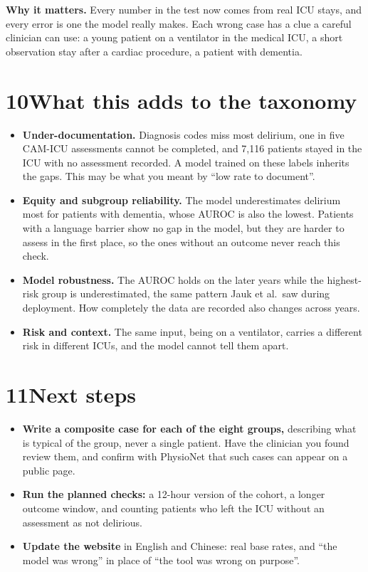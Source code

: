 \documentclass[11pt]{article}
\newcommand{\why}[1]{\begin{whynote}\textbf{\color{accent}Why it matters.} #1\end{whynote}}
\newcommand{\step}[2]{\section*{\color{accent}#1\quad\color{black}#2}}
\begin{document}
\why{Every number in the test now comes from real ICU stays, and every error is one the model really makes. Each wrong case has a clue a careful clinician can use: a young patient on a ventilator in the medical ICU, a short observation stay after a cardiac procedure, a patient with dementia.}

\step{10}{What this adds to the taxonomy}

\begin{itemize}
	\item \textbf{Under-documentation.} Diagnosis codes miss most delirium, one in five CAM-ICU assessments cannot be completed, and 7,116 patients stayed in the ICU with no assessment recorded. A model trained on these labels inherits the gaps. This may be what you meant by ``low rate to document''.
	\item \textbf{Equity and subgroup reliability.} The model underestimates delirium most for patients with dementia, whose AUROC is also the lowest. Patients with a language barrier show no gap in the model, but they are harder to assess in the first place, so the ones without an outcome never reach this check.
	\item \textbf{Model robustness.} The AUROC holds on the later years while the highest-risk group is underestimated, the same pattern Jauk et al.\ saw during deployment. How completely the data are recorded also changes across years.
	\item \textbf{Risk and context.} The same input, being on a ventilator, carries a different risk in different ICUs, and the model cannot tell them apart.
\end{itemize}

\step{11}{Next steps}

\begin{itemize}
	\item \textbf{Write a composite case for each of the eight groups,} describing what is typical of the group, never a single patient. Have the clinician you found review them, and confirm with PhysioNet that such cases can appear on a public page.
	\item \textbf{Run the planned checks:} a 12-hour version of the cohort, a longer outcome window, and counting patients who left the ICU without an assessment as not delirious.
	\item \textbf{Update the website} in English and Chinese: real base rates, and ``the model was wrong'' in place of ``the tool was wrong on purpose''.
\end{itemize}
\end{document}
